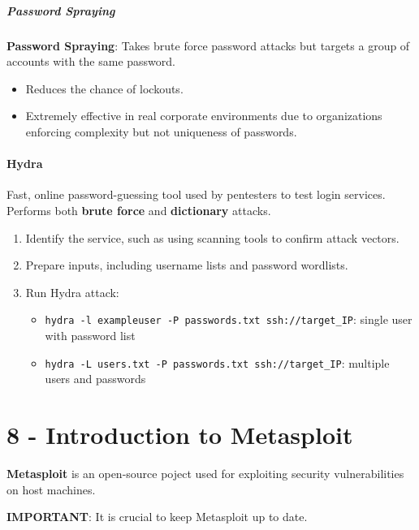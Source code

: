 \documentclass[12pt, letterpaper]{article}
\begin{document}
\subsubsection*{Password Spraying}

\textbf{Password Spraying}: Takes brute force password attacks but targets a group of accounts with the same password.

\begin{itemize}
    \item Reduces the chance of lockouts.
    \item Extremely effective in real corporate environments due to organizations enforcing complexity but not uniqueness of passwords.
\end{itemize}

\subsection*{Hydra}

Fast, online password-guessing tool used by pentesters to test login services. Performs both \textbf{brute force} and \textbf{dictionary} attacks.

\begin{enumerate}
    \item Identify the service, such as using scanning tools to confirm attack vectors.
    \item Prepare inputs, including username lists and password wordlists.
    \item Run Hydra attack:
        \begin{itemize}
            \item \texttt{hydra -l exampleuser -P passwords.txt ssh://target\_IP}: single user with password list
            \item \texttt{hydra -L users.txt -P passwords.txt ssh://target\_IP}: multiple users and passwords
        \end{itemize}
\end{enumerate}

\part*{8 - Introduction to Metasploit}

\textbf{Metasploit} is an open-source poject used for exploiting security vulnerabilities on host machines.

\bigskip

\textbf{IMPORTANT}: It is crucial to keep Metasploit up to date.
\end{document}
